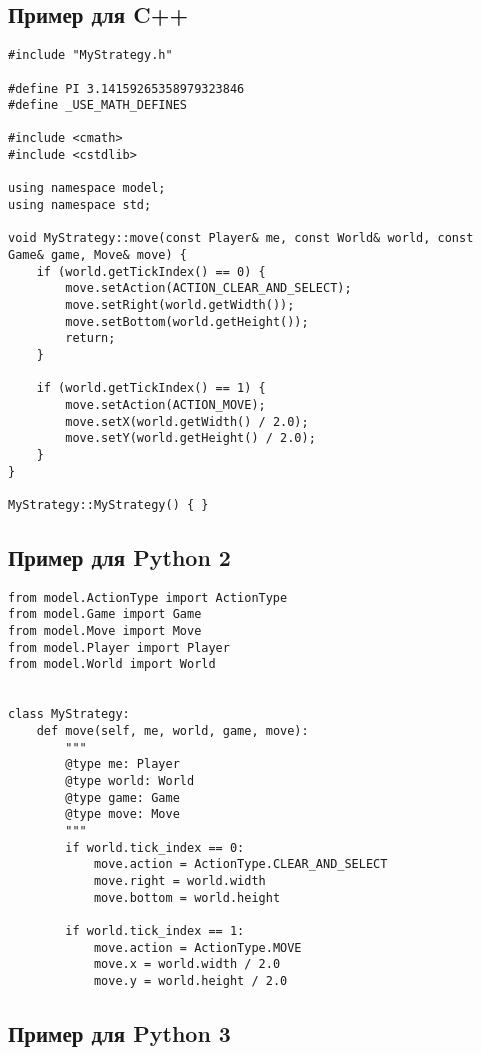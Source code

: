 \newpage
\subsection{Пример для C++}

\begin{verbatim}
#include "MyStrategy.h"

#define PI 3.14159265358979323846
#define _USE_MATH_DEFINES

#include <cmath>
#include <cstdlib>

using namespace model;
using namespace std;

void MyStrategy::move(const Player& me, const World& world, const Game& game, Move& move) {
    if (world.getTickIndex() == 0) {
        move.setAction(ACTION_CLEAR_AND_SELECT);
        move.setRight(world.getWidth());
        move.setBottom(world.getHeight());
        return;
    }

    if (world.getTickIndex() == 1) {
        move.setAction(ACTION_MOVE);
        move.setX(world.getWidth() / 2.0);
        move.setY(world.getHeight() / 2.0);
    }
}

MyStrategy::MyStrategy() { }
\end{verbatim}

\newpage
\subsection{Пример для Python 2}

\begin{verbatim}
from model.ActionType import ActionType
from model.Game import Game
from model.Move import Move
from model.Player import Player
from model.World import World


class MyStrategy:
    def move(self, me, world, game, move):
        """
        @type me: Player
        @type world: World
        @type game: Game
        @type move: Move
        """
        if world.tick_index == 0:
            move.action = ActionType.CLEAR_AND_SELECT
            move.right = world.width
            move.bottom = world.height

        if world.tick_index == 1:
            move.action = ActionType.MOVE
            move.x = world.width / 2.0
            move.y = world.height / 2.0
\end{verbatim}

\subsection{Пример для Python 3}

